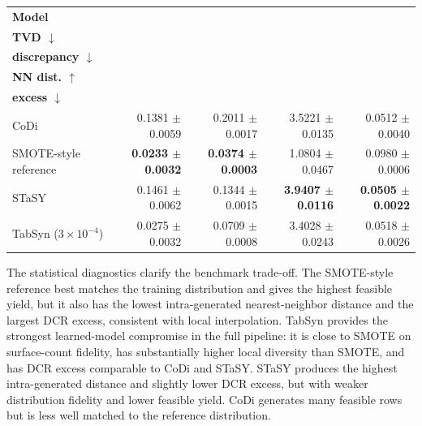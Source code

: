 \begin{center}
\begin{minipage}{0.98\linewidth}
\centering
\scriptsize
\setlength{\tabcolsep}{4pt}
\label{tab:section_6_1_statistical_diversity_novelty}
\begin{tabular}{lrrrr}
\toprule
\textbf{Model} & \shortstack{\textbf{Surface-count}\\\textbf{TVD $\downarrow$}} & \shortstack{\textbf{Conditional marginal}\\\textbf{discrepancy $\downarrow$}} & \shortstack{\textbf{Intra-generated}\\\textbf{NN dist. $\uparrow$}} & \shortstack{\textbf{DCR}\\\textbf{excess $\downarrow$}} \\
\midrule
CoDi & 0.1381 \ensuremath{\pm} 0.0059 & 0.2011 \ensuremath{\pm} 0.0017 & 3.5221 \ensuremath{\pm} 0.0135 & 0.0512 \ensuremath{\pm} 0.0040 \\
SMOTE-style reference & \textbf{0.0233 \ensuremath{\pm} 0.0032} & \textbf{0.0374 \ensuremath{\pm} 0.0003} & 1.0804 \ensuremath{\pm} 0.0467 & 0.0980 \ensuremath{\pm} 0.0006 \\
STaSY & 0.1461 \ensuremath{\pm} 0.0062 & 0.1344 \ensuremath{\pm} 0.0015 & \textbf{3.9407 \ensuremath{\pm} 0.0116} & \textbf{0.0505 \ensuremath{\pm} 0.0022} \\
TabSyn ($3\times10^{-4}$) & 0.0275 \ensuremath{\pm} 0.0032 & 0.0709 \ensuremath{\pm} 0.0008 & 3.4028 \ensuremath{\pm} 0.0243 & 0.0518 \ensuremath{\pm} 0.0026 \\
\bottomrule
\end{tabular}
\end{minipage}
\end{center}

The statistical diagnostics clarify the benchmark trade-off. The SMOTE-style reference best matches the training distribution and gives the highest feasible yield, but it also has the lowest intra-generated nearest-neighbor distance and the largest DCR excess, consistent with local interpolation. TabSyn provides the strongest learned-model compromise in the full pipeline: it is close to SMOTE on surface-count fidelity, has substantially higher local diversity than SMOTE, and has DCR excess comparable to CoDi and STaSY. STaSY produces the highest intra-generated distance and slightly lower DCR excess, but with weaker distribution fidelity and lower feasible yield. CoDi generates many feasible rows but is less well matched to the reference distribution.


